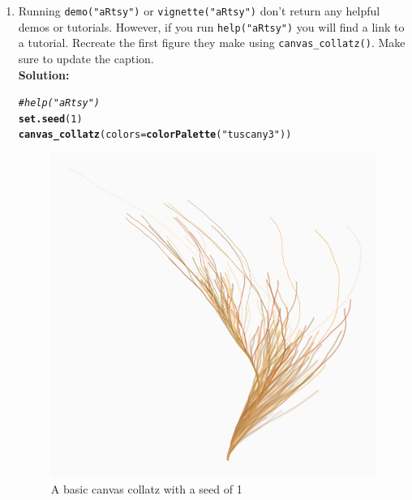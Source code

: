 \documentclass{article}\usepackage[]{graphicx}\usepackage[]{xcolor}
\makeatletter
\def\maxwidth{ %
  \ifdim\Gin@nat@width>\linewidth
    \linewidth
  \else
    \Gin@nat@width
  \fi
}
\newcommand{\hlnum}[1]{\textcolor[rgb]{0.686,0.059,0.569}{#1}}%
\newcommand{\hlsng}[1]{\textcolor[rgb]{0.192,0.494,0.8}{#1}}%
\newcommand{\hlcom}[1]{\textcolor[rgb]{0.678,0.584,0.686}{\textit{#1}}}%
\newcommand{\hldef}[1]{\textcolor[rgb]{0.345,0.345,0.345}{#1}}%
\newcommand{\hlkwc}[1]{\textcolor[rgb]{0.333,0.667,0.333}{#1}}%
\newcommand{\hlkwd}[1]{\textcolor[rgb]{0.737,0.353,0.396}{\textbf{#1}}}%
\newenvironment{kframe}{%
 \def\at@end@of@kframe{}%
 \ifinner\ifhmode%
  \def\at@end@of@kframe{\end{minipage}}%
  \begin{minipage}{\columnwidth}%
 \fi\fi%
 \def\FrameCommand##1{\hskip\@totalleftmargin \hskip-\fboxsep
 \colorbox{shadecolor}{##1}\hskip-\fboxsep
     \hskip-\linewidth \hskip-\@totalleftmargin \hskip\columnwidth}%
 \MakeFramed {\advance\hsize-\width
   \@totalleftmargin\z@ \linewidth\hsize
   \@setminipage}}%
 {\par\unskip\endMakeFramed%
 \at@end@of@kframe}
\newenvironment{knitrout}{}{} %
\makeatother
\begin{document}
\begin{enumerate}
\begin{enumerate}
 \item Running \texttt{demo("aRtsy")} or \texttt{vignette("aRtsy")} don't return 
 any helpful demos or tutorials. However, if you run \texttt{help("aRtsy")} you 
 will find a link to a tutorial. Recreate the first figure they make using 
 \texttt{canvas\_collatz()}. Make sure to update the caption.\\
\textbf{Solution:}
\begin{knitrout}\scriptsize
{}\color{fgcolor}\begin{kframe}
\begin{alltt}
\hlcom{# help("aRtsy")}
\hlkwd{set.seed}\hldef{(}\hlnum{1}\hldef{)}
\hlkwd{canvas_collatz}\hldef{(}\hlkwc{colors} \hldef{=} \hlkwd{colorPalette}\hldef{(}\hlsng{"tuscany3"}\hldef{))}
\end{alltt}
\end{kframe}
\end{knitrout}
\begin{figure}[H]
\begin{center}
\begin{knitrout}
\color{fgcolor}
\includegraphics[width=\maxwidth]{figure/unnamed-chunk-3-1} 
\end{knitrout}
\caption{A basic canvas collatz with a seed of 1}

\end{center}
\end{figure}
\end{enumerate}
\end{enumerate}
\end{document}
